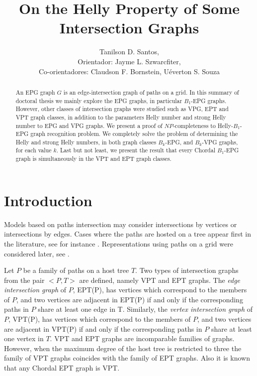 \documentclass[12pt]{article}
\title{On the Helly Property of  Some Intersection Graphs}
\author{Tanilson D. Santos\inst{1,2},\\ Orientador: Jayme L. Szwarcfiter\inst{1,3,4},\\ Co-orientadores: Claudson F. Bornstein\inst{1,3}, Uéverton S. Souza\inst{5} }
\begin{document}
 

\maketitle

\begin{abstract}
  An EPG graph  $G$  is an edge-intersection graph of paths on a grid. 
In this summary of doctoral thesis we mainly explore the  EPG graphs, in particular $B_1$-EPG graphs. However, other classes of intersection graphs were studied such as VPG, EPT and VPT graph classes, in addition to the parameters Helly number and strong Helly number to EPG and VPG graphs. We  present a proof of $NP$-completeness to Helly-$B_1$-EPG graph recognition problem. We completely solve the problem of determining the Helly and strong Helly numbers, in both graph classes $B_k$-EPG, and $B_k$-VPG graphs, for each value $k$. Last but not least,  we present the result that every Chordal $B_1$-EPG graph is simultaneously in the VPT and EPT graph classes. 
\end{abstract}
     


\section{Introduction}

Models based on paths intersection  may consider  intersections by vertices or   intersections by edges.  Cases where the paths are hosted on a tree  appear first in the literature, see for instance \cite{gavril1978recognition, golumbic1985}.  Representations using paths on a grid were considered later, see  \cite{golumbic2009,golumbic2013}.

 Let $P$ be a family of paths on a host tree $T$. Two types of intersection graphs from the pair $<P,T>$ are defined, namely VPT and EPT graphs.
The \textit{edge intersection graph} of $P$, EPT(P), has vertices which correspond to the members of $P$, and two vertices are adjacent in EPT(P) if and only if the corresponding paths in $P$ share at least one edge in T. Similarly, the \textit{vertex intersection graph} of $P$, VPT(P), has vertices which correspond to the members of $P$, and two vertices are adjacent in VPT(P) if and only if the corresponding paths in $P$ share at least one vertex in $T$.
%
VPT and EPT graphs are incomparable families of graphs. However, when the maximum degree of the host tree is restricted to three the family of
VPT graphs coincides with the family of EPT graphs. Also it is known that any Chordal EPT graph is VPT.
\end{document}
